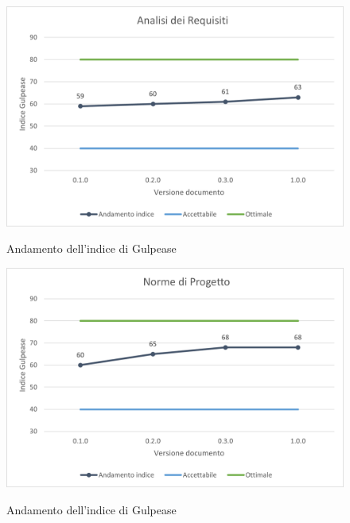 \begin{figure}[H]
\centering
\includegraphics[scale=0.90]{res/ResocontoAttivitaDiVerifica/res/img/gulpeaseADR.png}\\
\caption{Andamento dell'indice di Gulpease \AdR}
\end{figure}

\begin{figure}[H]
\centering
\includegraphics[scale=0.90]{res/ResocontoAttivitaDiVerifica/res/img/gulpeaseNDP.png}\\
\caption{Andamento dell'indice di Gulpease \NdP}
\end{figure}

